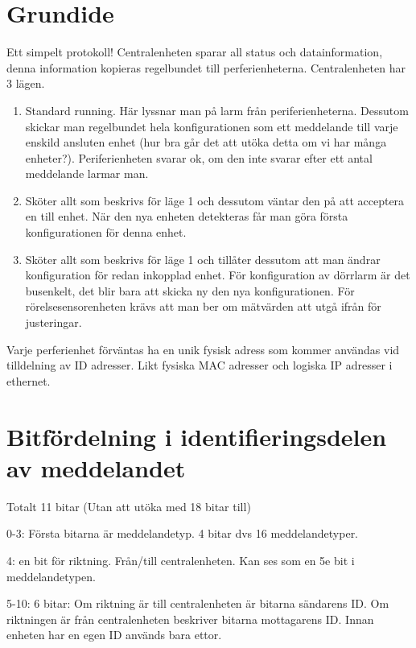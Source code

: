 \documentclass[a4paper]{article}
\begin{document}

\section*{Grundide}
\label{sec:grundide}

Ett simpelt protokoll! Centralenheten sparar all status och datainformation, denna information kopieras regelbundet till perferienheterna. Centralenheten har 3 lägen.

\begin{enumerate}
	\item Standard running. Här lyssnar man på larm från periferienheterna. Dessutom skickar man regelbundet hela konfigurationen som ett meddelande till varje enskild ansluten enhet (hur bra går det att utöka detta om vi har många enheter?). Periferienheten svarar ok, om den inte svarar efter ett antal meddelande larmar man.
	\item Sköter allt som beskrivs för läge 1 och dessutom väntar den på att acceptera en till enhet. När den nya enheten detekteras får man göra första konfigurationen för denna enhet.
	\item Sköter allt som beskrivs för läge 1 och tillåter dessutom att man ändrar konfiguration för redan inkopplad enhet. För konfiguration av dörrlarm är det busenkelt, det blir bara att skicka ny den nya konfigurationen. För rörelsesensorenheten krävs att man ber om mätvärden att utgå ifrån för justeringar.
\end{enumerate}

Varje perferienhet förväntas ha en unik fysisk adress som kommer användas vid tilldelning av ID adresser. Likt fysiska MAC adresser och logiska IP adresser i ethernet.

\section*{Bitfördelning i identifieringsdelen av meddelandet}
\label{sec:bitfördelning}

Totalt 11 bitar (Utan att utöka med 18 bitar till)
\begin{description}
	\item{0-3:} Första bitarna är meddelandetyp. 4 bitar dvs 16 meddelandetyper.
	\item{4:} en bit för riktning. Från/till centralenheten. Kan ses som en 5e bit i meddelandetypen.
	\item{5-10:} 6 bitar:
		Om riktning är till centralenheten är bitarna sändarens ID.
		Om riktningen är från centralenheten beskriver bitarna mottagarens ID.
		Innan enheten har en egen ID används bara ettor.
\end{description}
\end{document}
